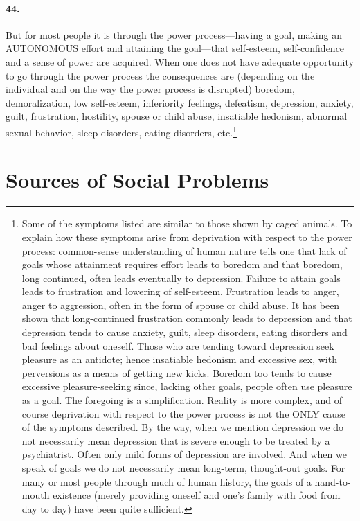 \documentclass[12pt]{book}
\newcommand{\mysection}[1]{\section*{#1} \addcontentsline{toc}{section}{#1}}
\begin{document}
\paragraph{44.} But for most people it is through the power process---having a goal, making an AUTONOMOUS effort and attaining the goal---that self-esteem, self-confidence and a sense of power are acquired. When one does not have adequate opportunity to go through the power process the consequences are (depending on the individual and on the way the power process is disrupted) boredom, demoralization, low self-esteem, inferiority feelings, defeatism, depression, anxiety, guilt, frustration, hostility, spouse or child abuse, insatiable hedonism, abnormal sexual behavior, sleep disorders, eating disorders, etc.\footnote{Some of the symptoms listed are similar to those shown by caged animals. To explain how these symptoms arise from deprivation with respect to the power process: common-sense understanding of human nature tells one that lack of goals whose attainment requires effort leads to boredom and that boredom, long continued, often leads eventually to depression. Failure to attain goals leads to frustration and lowering of self-esteem. Frustration leads to anger, anger to aggression, often in the form of spouse or child abuse. It has been shown that long-continued frustration commonly leads to depression and that depression tends to cause anxiety, guilt, sleep disorders, eating disorders and bad feelings about oneself. Those who are tending toward depression seek pleasure as an antidote; hence insatiable hedonism and excessive sex, with perversions as a means of getting new kicks. Boredom too tends to cause excessive pleasure-seeking since, lacking other goals, people often use pleasure as a goal. The foregoing is a simplification. Reality is more complex, and of course deprivation with respect to the power process is not the ONLY cause of the symptoms described. By the way, when we mention depression we do not necessarily mean depression that is severe enough to be treated by a psychiatrist. Often only mild forms of depression are involved. And when we speak of goals we do not necessarily mean long-term, thought-out goals. For many or most people through much of human history, the goals of a hand-to-mouth existence (merely providing oneself and one's family with food from day to day) have been quite sufficient.}

\mysection{Sources of Social Problems}
\end{document}
